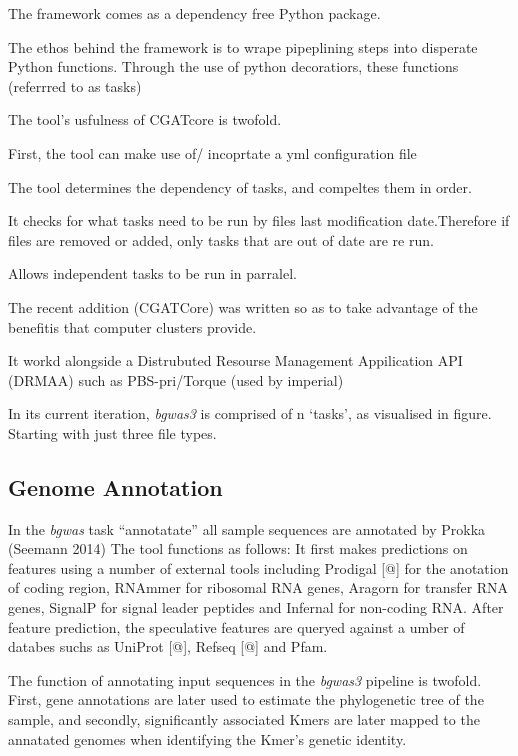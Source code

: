 \documentclass[]{article}
\begin{document}
The framework comes as a dependency free Python package.

The ethos behind the framework is to wrape pipeplining steps into
disperate Python functions. Through the use of python decoratiors, these
functions (referrred to as tasks)

The tool's usfulness of CGATcore is twofold.

First, the tool can make use of/ incoprtate a yml configuration file

The tool determines the dependency of tasks, and compeltes them in
order.

It checks for what tasks need to be run by files last modification
date.Therefore if files are removed or added, only tasks that are out of
date are re run.

Allows independent tasks to be run in parralel.

The recent addition (CGATCore) was written so as to take advantage of
the benefitis that computer clusters provide.

It workd alongside a Distrubuted Resourse Management Appilication API
(DRMAA) such as PBS-pri/Torque (used by imperial)

In its current iteration, \emph{bgwas3} is comprised of n `tasks', as
visualised in figure. Starting with just three file types.

\hypertarget{genome-annotation}{%
\subsection{Genome Annotation}\label{genome-annotation}}

In the \emph{bgwas} task ``annotatate'' all sample sequences are
annotated by Prokka (Seemann 2014) The tool functions as follows: It
first makes predictions on features using a number of external tools
including Prodigal {[}@{]} for the anotation of coding region, RNAmmer
for ribosomal RNA genes, Aragorn for transfer RNA genes, SignalP for
signal leader peptides and Infernal for non-coding RNA. After feature
prediction, the speculative features are queryed against a umber of
databes suchs as UniProt {[}@{]}, Refseq {[}@{]} and Pfam.

The function of annotating input sequences in the \emph{bgwas3} pipeline
is twofold. First, gene annotations are later used to estimate the
phylogenetic tree of the sample, and secondly, significantly associated
Kmers are later mapped to the annatated genomes when identifying the
Kmer's genetic identity.
\end{document}
